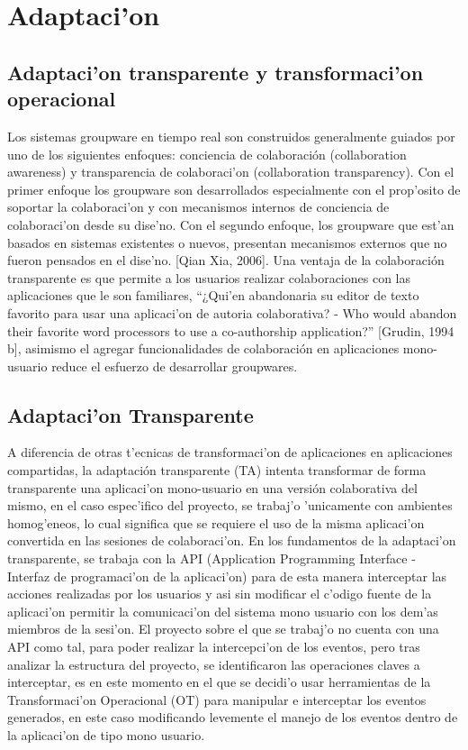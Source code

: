 \chapter{Adaptaci'on}
\label{capitulocuatro}

\section{Adaptaci'on transparente y transformaci'on operacional}

Los sistemas groupware en tiempo real son construidos generalmente guiados por uno de los siguientes enfoques: conciencia de colaboración (collaboration awareness) y transparencia de colaboraci'on (collaboration transparency).
\medskip
Con el primer enfoque los groupware son desarrollados especialmente con el prop'osito de soportar la colaboraci'on y con mecanismos internos de conciencia de colaboraci'on desde su dise'no. Con el segundo enfoque, los groupware que est'an basados en sistemas existentes o nuevos, presentan mecanismos externos que no fueron pensados en el dise'no. [Qian Xia, 2006].
\medskip
Una ventaja de la colaboración transparente es que permite a los usuarios realizar colaboraciones con las aplicaciones que le son familiares, “¿Qui'en abandonaria su editor de texto favorito para usar una aplicaci'on de autoria colaborativa? - Who would abandon their favorite word processors to use a co-authorship application?” [Grudin, 1994 b], asimismo el agregar funcionalidades de colaboración en aplicaciones mono-usuario reduce el esfuerzo de desarrollar groupwares.

\section{Adaptaci'on Transparente}

A diferencia de otras t'ecnicas de transformaci'on de aplicaciones en aplicaciones compartidas, la adaptación transparente (TA) intenta transformar de forma transparente una aplicaci'on mono-usuario en una versión colaborativa del mismo, en el caso espec'ifico del proyecto, se trabaj'o 'unicamente con ambientes homog'eneos, lo cual significa que se requiere el uso de la misma aplicaci'on convertida en las sesiones de colaboraci'on.
\medskip
En los fundamentos de la adaptaci'on transparente, se trabaja con la API (Application Programming Interface - Interfaz de programaci'on de la aplicaci'on) para de esta manera interceptar las acciones realizadas por los usuarios y asi sin modificar el c'odigo
fuente de la aplicaci'on permitir la comunicaci'on del sistema mono usuario con los dem'as miembros de la sesi'on.
\medskip
El proyecto sobre el que se trabaj'o no cuenta con una API como tal, para poder realizar la intercepci'on de los eventos, pero tras analizar la estructura del proyecto, se identificaron las
operaciones claves a interceptar, es en este momento en el que se decidi'o usar herramientas de la Transformaci'on Operacional (OT) para manipular e interceptar los eventos generados, en este caso modificando levemente el manejo de los eventos dentro de la aplicaci'on de tipo mono usuario.

